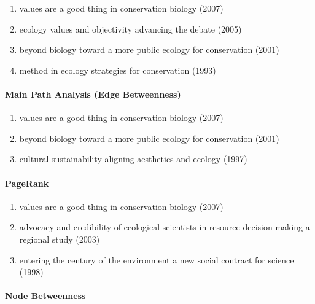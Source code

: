 \documentclass[lettepaper,]{article}
\providecommand{\tightlist}{%
  \setlength{\itemsep}{0pt}\setlength{\parskip}{0pt}}
\let\oldparagraph\paragraph
\renewcommand{\paragraph}[1]{\oldparagraph{#1}\mbox{}}
\begin{document}
\begin{enumerate}
\def\labelenumi{\arabic{enumi}.}
\tightlist
\item
  values are a good thing in conservation biology (2007)
\item
  ecology values and objectivity advancing the debate (2005)
\item
  beyond biology toward a more public ecology for conservation (2001)
\item
  method in ecology strategies for conservation (1993)
\end{enumerate}

\hypertarget{main-path-analysis-edge-betweenness-4}{%
\paragraph{Main Path Analysis (Edge
Betweenness)}\label{main-path-analysis-edge-betweenness-4}}

\begin{enumerate}
\def\labelenumi{\arabic{enumi}.}
\tightlist
\item
  values are a good thing in conservation biology (2007)
\item
  beyond biology toward a more public ecology for conservation (2001)
\item
  cultural sustainability aligning aesthetics and ecology (1997)
\end{enumerate}

\hypertarget{pagerank-7}{%
\paragraph{PageRank}\label{pagerank-7}}

\begin{enumerate}
\def\labelenumi{\arabic{enumi}.}
\tightlist
\item
  values are a good thing in conservation biology (2007)
\item
  advocacy and credibility of ecological scientists in resource
  decision-making a regional study (2003)
\item
  entering the century of the environment a new social contract for
  science (1998)
\end{enumerate}

\hypertarget{node-betweenness-4}{%
\paragraph{Node Betweenness}\label{node-betweenness-4}}
\end{document}
